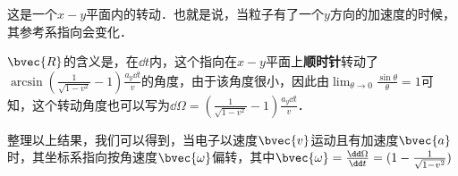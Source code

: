 这是一个$x-y$平面内的转动．也就是说，当粒子有了一个$y$方向的加速度的时候，其参考系指向会变化．

$\bvec{R}$的含义是，在$\dd t$内，这个指向在$x-y$平面上\textbf{顺时针}转动了$\arcsin{(\frac{1}{\sqrt{1-v^2}}-1)\frac{a_y\dd t}{v}}$的角度，由于该角度很小，因此由$\lim_{\theta\rightarrow 0}\frac{\sin\theta}{\theta}=1$可知，这个转动角度也可以写为$\dd\Omega=(\frac{1}{\sqrt{1-v^2}}-1)\frac{a_y\dd t}{v}$．

整理以上结果，我们可以得到，当电子以速度$\bvec{v}$运动且有加速度$\bvec{a}$时，其坐标系指向按角速度$\bvec{\omega}$偏转，其中$\bvec{\omega}=\frac{\dd\Omega}{\dd t}=(1-\frac{1}{\sqrt{1-v^2}})$








